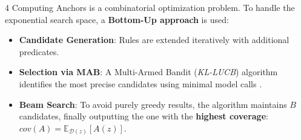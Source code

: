 \documentclass[a0,landscape]{a0poster}
\begin{document}
\begin{multicols}{4}
Computing Anchors is a combinatorial optimization problem. To handle the exponential search space, a 
\textbf{Bottom-Up approach} is used:
\begin{itemize}
    \item \textbf{Candidate Generation}: Rules are extended iteratively with additional predicates.
    \item \textbf{Selection via MAB}: A Multi-Armed Bandit (\textit{KL-LUCB}) algorithm identifies 
    the most precise candidates using minimal model calls \cite{ribeiro_anchors_2018}.
    \item \textbf{Beam Search}: To avoid purely greedy results, the algorithm maintains $B$ candidates, 
    finally outputting the one with the \textbf{highest coverage}: $cov(A) = \mathbb{E}_{\mathcal{D}(z)} [A(z)]$.
\end{itemize}

\end{multicols}

\vspace{-1cm}

\printbibliography[heading=custombib]


\end{document}
